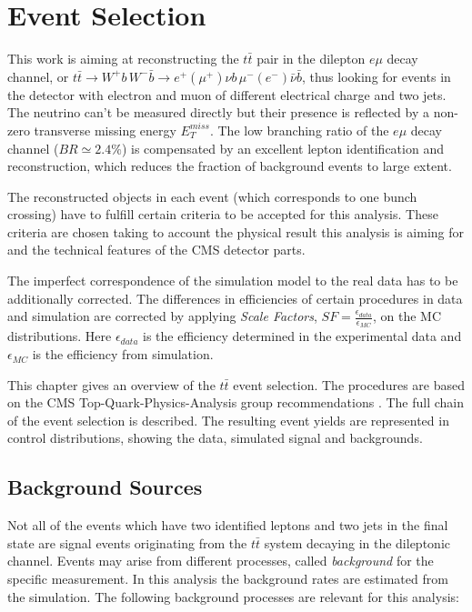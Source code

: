 \chapter{Event Selection}\label{chapt:event_sel}
 
This work is aiming at reconstructing the $t\bar{t}$ pair in the dilepton $e\mu$ decay channel, or
$t\bar{t} \to W^{+}b\,W^{-}\bar{b} \to e^{+}(\mu^{+})\nu b\,\mu^{-}(e^{-})\bar{\nu}\bar{b}$, thus 
looking for events in the detector with electron and muon of different electrical charge and two jets. The 
neutrino can't be measured directly but their presence is reflected by a non-zero transverse
missing energy $E_{T}^{miss}$. The low branching ratio of the $e\mu$ decay channel
($BR \simeq 2.4\%$) is compensated by an excellent lepton identification and reconstruction, 
which reduces the fraction of background events to large extent.

The reconstructed objects in each event (which corresponds to one bunch crossing) have to fulfill certain 
criteria to be accepted for this analysis. These criteria are chosen taking to account the physical 
result this analysis is aiming for and the technical features of the CMS detector parts.

The imperfect correspondence of the simulation model to the real data has to be additionally 
corrected. The differences in efficiencies of certain procedures in data and simulation 
are corrected by applying \textit{Scale Factors}, $SF = \frac{\epsilon_{data}}{\epsilon_{MC}}$, 
on the MC distributions. Here $\epsilon_{data}$ is the efficiency determined in the experimental 
data and $\epsilon_{MC}$ is the efficiency from simulation. 

This chapter gives an overview of the $t\bar{t}$ event selection. The 
procedures are based on the CMS Top-Quark-Physics-Analysis group recommendations \cite{TopPAGreco}.
The full chain of the event selection is described. 
The resulting event yields are represented in control distributions, showing the data, simulated signal and backgrounds.

\section{Background Sources}\label{sec:bg_intro}

Not all of the events which have two identified leptons and two jets in the final state are signal events
originating from the $t\bar{t}$ system decaying in the dileptonic channel. Events may arise from different processes, 
called \textit{background} for the specific measurement. In this analysis the background rates are estimated 
from the simulation. The following background processes are relevant for this analysis:

